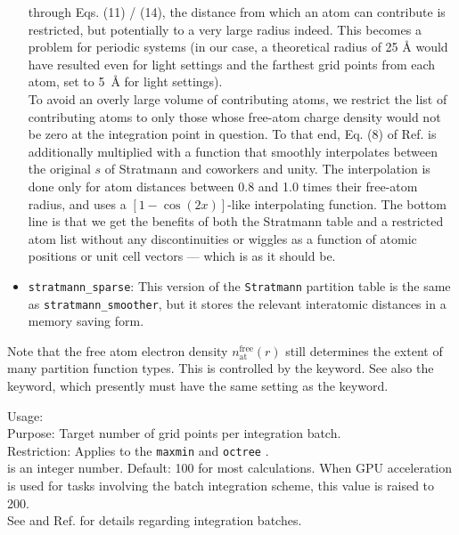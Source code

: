 \begin{itemize}
    through Eqs. (11) / (14), the distance from which an atom can contribute is restricted, but
    potentially to a very large radius indeed. This becomes a problem for periodic systems (in our case,
    a theoretical radius of 25 {\AA} would have resulted even for light settings and the farthest grid
    points from each atom, set to 5~{\AA} for light settings). \\
    To avoid an overly large volume of contributing atoms, we restrict the list of contributing atoms
    to only those whose free-atom charge density would not be zero at the integration point in question.
    To that end, Eq. (8) of Ref. \cite{Stratmann96} is additionally multiplied with a function that 
    smoothly interpolates between the original $s$ of Stratmann and coworkers and unity. The interpolation
    is done only for atom distances between 0.8 and 1.0 times their free-atom radius, and uses a 
    $[1-\cos(2x)]$-like interpolating function. The bottom line is that we get the benefits of both
    the Stratmann table and a restricted atom list without any discontinuities or wiggles as a 
    function of atomic positions or unit cell vectors --- which is as it should be.
  \item \texttt{stratmann\_sparse}: This version of the \texttt{Stratmann} partition table is the same as
    \texttt{stratmann\_smoother}, but it stores the relevant interatomic distances in a memory saving form.
\end{itemize}
Note that the free atom electron density $n_\text{at}^\text{free}(r)$
still determines the extent of many partition function types. This is
controlled by the  keyword. See
also the 
keyword, which presently must have the same setting as the
 keyword.

{
  \noindent
  Usage:   \\[1.0ex]
  Purpose: Target number of grid points per integration batch. \\[1.0ex]
  Restriction: Applies to the \texttt{maxmin} and \texttt{octree}
    . \\[1.0ex] 
   is an integer number. Default: 100 for most calculations.  When GPU acceleration is used for tasks involving the batch integration scheme, this value is raised to 200. \\
}
See  and Ref. \cite{Havu08} for
details regarding integration batches. 


